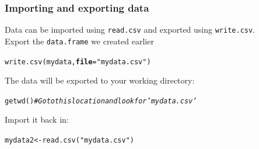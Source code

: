 \documentclass[color=usenames,dvipsnames]{beamer}\usepackage[]{graphicx}\usepackage[]{color}
\makeatletter
\newcommand{\hlstr}[1]{\textcolor[rgb]{0.749,0.012,0.012}{#1}}%
\newcommand{\hlcom}[1]{\textcolor[rgb]{0.514,0.506,0.514}{\textit{#1}}}%
\newcommand{\hlstd}[1]{\textcolor[rgb]{0,0,0}{#1}}%
\newcommand{\hlkwb}[1]{\textcolor[rgb]{0,0.341,0.682}{#1}}%
\newcommand{\hlkwc}[1]{\textcolor[rgb]{0,0,0}{\textbf{#1}}}%
\newcommand{\hlkwd}[1]{\textcolor[rgb]{0.004,0.004,0.506}{#1}}%
\newenvironment{kframe}{%
 \def\at@end@of@kframe{}%
 \ifinner\ifhmode%
  \def\at@end@of@kframe{\end{minipage}}%
  \begin{minipage}{\columnwidth}%
 \fi\fi%
 \def\FrameCommand##1{\hskip\@totalleftmargin \hskip-\fboxsep
 \colorbox{shadecolor}{##1}\hskip-\fboxsep
     \hskip-\linewidth \hskip-\@totalleftmargin \hskip\columnwidth}%
 \MakeFramed {\advance\hsize-\width
   \@totalleftmargin\z@ \linewidth\hsize
   \@setminipage}}%
 {\par\unskip\endMakeFramed%
 \at@end@of@kframe}
\newenvironment{knitrout}{}{} %
\newcommand{\inr}[1]{\colorbox{inlinecolor}{\texttt{#1}}}
\makeatother
\begin{document}
\begin{frame}[fragile]
  \frametitle{Importing and exporting data}
  Data can be imported using \inr{read.csv} and exported using \inr{write.csv}. \\
  \small
  \pause \vfill
  Export the \verb+data.frame+ we created earlier
\begin{knitrout}\small
{}\color{fgcolor}\begin{kframe}
\begin{alltt}
\hlkwd{write.csv}\hlstd{(mydata,} \hlkwc{file}\hlstd{=}\hlstr{"mydata.csv"}\hlstd{)}
\end{alltt}
\end{kframe}
\end{knitrout}
  \pause \vfill
The data will be exported to your working directory:
\begin{knitrout}\scriptsize
{}\color{fgcolor}\begin{kframe}
\begin{alltt}
\hlkwd{getwd}\hlstd{()} \hlcom{# Go to this location and look for 'mydata.csv'}
\end{alltt}
\end{kframe}
\end{knitrout}
  \pause \vfill
Import it back in:
\begin{knitrout}\small
{}\color{fgcolor}\begin{kframe}
\begin{alltt}
\hlstd{mydata2} \hlkwb{<-} \hlkwd{read.csv}\hlstd{(}\hlstr{"mydata.csv"}\hlstd{)}
\end{alltt}
\end{kframe}
\end{knitrout}
\end{frame}
\end{document}
